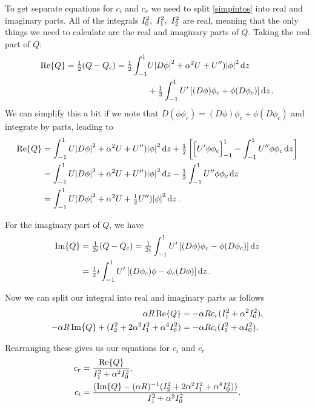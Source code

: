 To get separate equations for $ c_i $ and $ c_r $ we need to split \eqref{simpintos} into real and imaginary parts. All of the integrals $ \I{0},\ \I{1},\ \I{2}$ are real, meaning that the only things we need to calculate are the real and imaginary parts of $Q $. Taking the real part of $ Q $:
\begin{align}
    \Re{Q} = \tfrac{1}{2}(Q - Q_c) = \tfrac{1}{2} \inte{1}{-1}{&U \abs{D \phi}^2 + \alpha^2 U + U'') \abs{\phi}^2}{z} \nonumber\\
    &+ \tfrac{1}{2} \inte{1}{-1}{U' \qb{(D \phi) \phi_c + \phi (D \phi_c)}}{z}.
\end{align}
We can simplify this a bit if we note that $ D(\phi \phi_c) = (D \phi) \phi_c + \phi (D \phi_c) $ and integrate by parts, leading to
\begin{align}
    \Re{Q} &= \inte{1}{-1}{U \abs{D \phi}^2 + \alpha^2 U + U'') \abs{\phi}^2}{z} + \tfrac{1}{2} \qb{\ieval{1}{-1}{U' \phi \phi_c} - \inte{1}{-1}{U'' \phi \phi_c}{z}} \nonumber\\
    &= \inte{1}{-1}{U \abs{D \phi}^2 + \alpha^2 U + U'') \abs{\phi}^2}{z} - \tfrac{1}{2}\inte{1}{-1}{U'' \phi \phi_c}{z} \nonumber\\ 
    &= \inte{1}{-1}{U \abs{D \phi}^2 + \alpha^2 U + \tfrac{1}{2} U'') \abs{\phi}^2}{z}.
    \label{reQ}
\end{align}

For the imaginary part of $Q$, we have
\begin{align}
    \Im{Q} &= \tfrac{1}{2i} (Q - Q_c) = \tfrac{1}{2i} \inte{1}{-1}{U' \qb{(D \phi) \phi_c - \phi (D \phi_c)}}{z} \nonumber\\ 
    &= \tfrac{1}{2} i \inte{1}{-1}{U' \qb{(D \phi_c) \phi - \phi_c (D \phi)}}{z}.
\label{imQ}
\end{align}

Now we can split our integral into real and imaginary parts as follows
\begin{align}
    \alpha R \Re{Q} &= - \alpha R c_r (\I{1} + \alpha^2 \I{0}), \\
    -\alpha R \Im{Q} + (\I{2} + 2 \alpha^2 \I{1} + \alpha^4 \I{0}) &= -\alpha R c_i (\I{1} + \alpha \I{0}).
\end{align}

Rearranging these gives us our equations for $ c_i $ and $ c_r$
\begin{subequations}
    \begin{align}
        c_r &= \frac{\Re{Q}}{\I{1} + \alpha^2 \I{0}}, \label{c_r} \\
        c_i &= \frac{(\Im{Q} - (\alpha R)^{-1} (\I{2} + 2 \alpha^2 \I{1} + \alpha^4 \I{0}))}{\I{1} + \alpha^2 \I{0}}. \label{c_i}
\end{align}    
\end{subequations}


